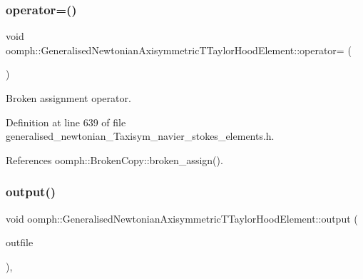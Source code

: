 \subsubsection{\texorpdfstring{operator=()}{operator=()}}
{\footnotesize\ttfamily void oomph\+::\+Generalised\+Newtonian\+Axisymmetric\+T\+Taylor\+Hood\+Element\+::operator= (\begin{DoxyParamCaption}\item[{const \hyperlink{classoomph_1_1GeneralisedNewtonianAxisymmetricTTaylorHoodElement}{Generalised\+Newtonian\+Axisymmetric\+T\+Taylor\+Hood\+Element} \&}]{ }\end{DoxyParamCaption})\hspace{0.3cm}{\ttfamily [inline]}}



Broken assignment operator. 



Definition at line 639 of file generalised\+\_\+newtonian\+\_\+\+Taxisym\+\_\+navier\+\_\+stokes\+\_\+elements.\+h.



References oomph\+::\+Broken\+Copy\+::broken\+\_\+assign().

\mbox{\label{classoomph_1_1GeneralisedNewtonianAxisymmetricTTaylorHoodElement_a27e5fdda8d9499f20b99f82443d37b78}} 
\subsubsection{\texorpdfstring{output()}{output()}\hspace{0.1cm}{\footnotesize\ttfamily [1/4]}}
{\footnotesize\ttfamily void oomph\+::\+Generalised\+Newtonian\+Axisymmetric\+T\+Taylor\+Hood\+Element\+::output (\begin{DoxyParamCaption}\item[{std\+::ostream \&}]{outfile }\end{DoxyParamCaption})\hspace{0.3cm}{\ttfamily [inline]}, {\ttfamily [virtual]}}



